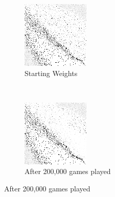 
\begin{figure}
\center

	\begin{subfigure}[b]{0.4\textwidth}
	\includegraphics[width=\linewidth]{images/findings/round2/flipbook/winner/checkpoint_000000.png}
	\caption{Starting Weights}
	\end{subfigure}
	~
	\begin{subfigure}[b]{0.4\textwidth}
	\includegraphics[width=\linewidth]{images/findings/round2/flipbook/winner/checkpoint_200000.png}
	\caption{After 200,000 games played}
	\end{subfigure}


\end{figure}
